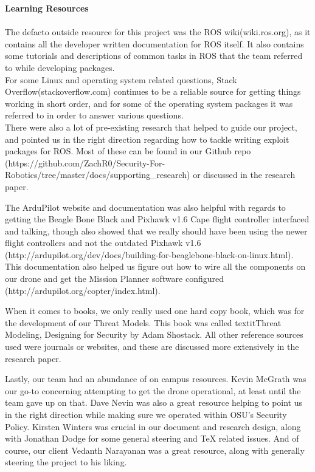 \documentclass[IEEEtran,letterpaper,10pt,notitlepage,draftclsnofoot,onecolumn]{article}
\begin{document}
\LARGE\textbf{Learning Resources\\ \\}\normalsize
The defacto outside resource for this project was the ROS wiki\cite{ROSWIKI}(wiki.ros.org), as it
contains all the developer written documentation for ROS itself. It also
contains some tutorials and descriptions of common tasks in ROS that the
team referred to while developing packages.\\
For some Linux and operating system related questions, Stack Overflow\cite{SO}(stackoverflow.com)
continues to be a reliable source for getting things working in short order, and
for some of the operating system packages it was referred to in order to answer
various questions.\\
There were also a lot of pre-existing research that helped to guide our project, and pointed us in the right
direction regarding how to tackle writing exploit packages for ROS. Most of these can be found in our Github
repo \cite{GitRepoSupporting}(https://github.com/ZachR0/Security-For-Robotics/tree/master/docs/supporting\_research) or discussed in the research paper.

The ArduPilot website and documentation was also helpful with regards to getting the Beagle Bone Black and
Pixhawk v1.6 Cape flight controller interfaced and talking, though also showed that we really should have been
using the newer flight controllers and not the outdated Pixhawk v1.6 \cite{ArduProjectDevDocs}(http://ardupilot.org/dev/docs/building-for-beaglebone-black-on-linux.html). This
documentation also helped us figure out how to wire all the components on our drone and get the Mission Planner software configured \cite{ArduProjectDocs}(http://ardupilot.org/copter/index.html).

When it comes to books, we only really used one hard copy book, which was for the development of our Threat Models.
This book was called textit{Threat Modeling, Designing for Security} by Adam Shostack. \cite{TMDS}
All other reference sources used were journals or websites, and these are discussed more extensively in the research paper.

Lastly, our team had an abundance of on campus resources. Kevin McGrath was our go-to
concerning attempting to get the drone operational, at least until the team gave up on
that. Dave Nevin was also a great resource helping to point us in the right direction while making sure
we operated within OSU's Security Policy.
Kirsten Winters was crucial in our document and research design, along with Jonathan
Dodge for some general steering and TeX related issues. And of course, our client Vedanth
Narayanan was a great resource, along with generally steering the project to his liking.

{}

\end{document}
